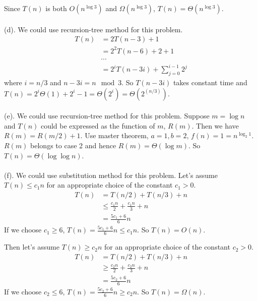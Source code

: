 \documentclass[twoside,11pt]{homework}
\begin{document}
Since $T(n)$ is both $O(n^{\log 3})$ and $\Omega(n^{\log 3})$, $T(n) =  \Theta(n^{\log 3}) $.
\\\\
(d).
We could use recursion-tree method for this problem.
%
\begin{equation}
\begin{split}
T(n) &= 2  T(n-3) + 1 \\
         &=2^2 T(n-6) + 2 + 1 \\
         & \cdots \\
         &=2^i T(n-3i) + \sum_{j=0}^{i-1} 2^j
\end{split}
\end{equation}
%
where $i = n/3$ and $n-3i = n \mod 3$.
So $T(n-3i) $ takes constant time and $T(n) = 2^i \Theta(1) + 2^i-1 = \Theta (2^i) = \Theta (2^{(n/3)})$.
\\\\
(e).
We could use recursion-tree method for this problem.
Suppose $m = \log n$ and $T(n)$ could be expressed as the function of $m$, $R(m)$.
Then we have $R(m) = R(m/2) + 1$.
Use master theorem, $a=1, b = 2$, $f(n) = 1 = n^{\log_2 1}$.
$R(m)$ belongs to case 2 and hence $R(m) = \Theta(\log m)$.
So $T(n) = \Theta (\log \log n)$.
\\\\
(f).
We could use substitution method for this problem.
Let's assume $T(n) \le c_1 n$ for an appropriate choice of the constant $c_1 > 0$.
%
\begin{equation}
\begin{split}
T(n) &= T(n/2) + T(n/3) + n \\
	& \le \frac{c_1 n}{2} + \frac{c_1 n}{3} + n \\
	&= \frac{5c_1 + 6}{6} n
\end{split}
\end{equation}
%
If we choose $c_1 \ge 6$, $T(n) = \frac{5c_1 + 6}{6} n \le c_1 n$.
So $T(n) = O(n)$.

Then let's assume $T(n) \ge c_2 n$ for an appropriate choice of the constant $c_2 > 0$.
%
\begin{equation}
\begin{split}
T(n) &= T(n/2) + T(n/3) + n \\
	& \ge \frac{c_2 n}{2} + \frac{c_2 n}{3} + n \\
	&= \frac{5c_2 + 6}{6} n
\end{split}
\end{equation}
%
If we choose $c_2 \le 6$, $T(n) = \frac{5c_2 + 6}{6} n \ge c_2 n$.
So $T(n) = \Omega(n)$.
\end{document}

